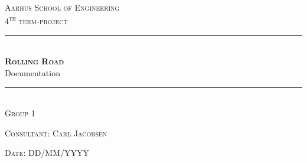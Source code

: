 \newcommand{\HRule}{\rule{\linewidth}{0.1mm}} %

\begin{center}
	
	\textsc{\LARGE Aarhus School of Engineering}\\[1.5cm] %
	
	\textsc{\large 4\textsuperscript{th} term-project}\\[2.5cm] 
	\HRule \\[0.8cm]
	{\huge \bfseries \textsc{Rolling Road}} \\[0.5cm]{\LARGE Documentation} \\[0.4cm]
	\HRule \\[1.5cm]
	
	\textsc{\large Group 1}\\
	\vspace{0.5 in}
	\begin{center}
		
	\end{center}
	\vspace{0.5 in}
	
	\textsc{\large Consultant: Carl Jacobsen}
	\vspace{0.5 in}
	
	\textsc{\large Date: DD/MM/YYYY}\\
	
\end{center} %

\newpage